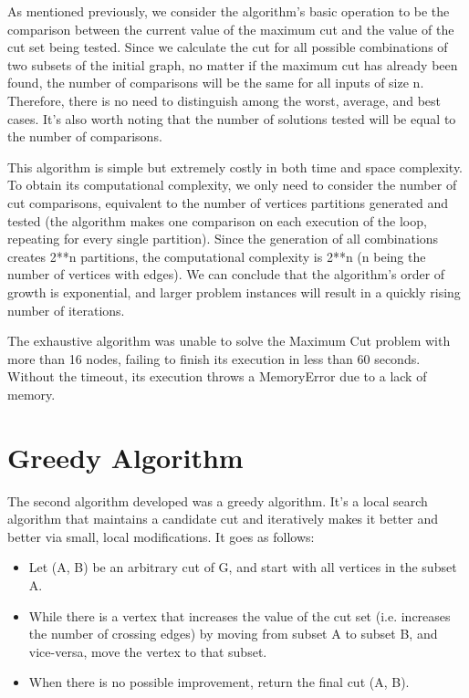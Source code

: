 \documentclass[]{revdetua}
\begin{document}
As mentioned previously, we consider the algorithm's basic operation to be the comparison between the current value of the maximum cut and the value of the cut set being tested. Since we calculate the cut for all possible combinations of two subsets of the initial graph, no matter if the maximum cut has already been found, the number of comparisons will be the same for all inputs of size n. Therefore, there is no need to distinguish among the worst, average, and best cases. It's also worth noting that the number of solutions tested will be equal to the number of comparisons. 

This algorithm is simple but extremely costly in both time and space complexity. To obtain its computational complexity, we only need to consider the number of cut comparisons, equivalent to the number of vertices partitions generated and tested (the algorithm makes one comparison on each execution of the loop, repeating for every single partition). Since the generation of all combinations creates 2**n partitions, the computational complexity is 2**n (n being the number of vertices with edges). We can conclude that the algorithm's order of growth is exponential, and larger problem instances will result in a quickly rising number of iterations.

The exhaustive algorithm was unable to solve the Maximum Cut problem with more than 16 nodes, failing to finish its execution in less than 60 seconds. Without the timeout, its execution throws a MemoryError due to a lack of memory.

\section{Greedy Algorithm}

The second algorithm developed was a greedy algorithm. It's a local search algorithm that maintains a candidate cut and iteratively makes it better and better via small, local modifications. It goes as follows:
\begin{itemize}
\item Let (A, B) be an arbitrary cut of G, and start with all vertices in the subset A.
\item While there is a vertex that increases the value of the cut set (i.e. increases the number of crossing edges) by moving from subset A to subset B, and vice-versa, move the vertex to that subset.
\item When there is no possible improvement, return the final cut (A, B).
\end{itemize}
\end{document}
